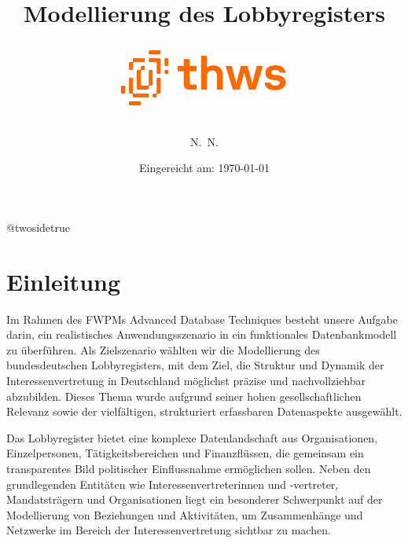 \documentclass[12pt,twoside=false,a4paper,parskip]{scrbook}
\makeatletter
\def\BaAuthor{Noah Raupold (5022097),\\ David Gläsle(5022114)}
\def\BaAuthorStudyProgram{Informatik} %
\def\BaType{ADT Portfolio} %
\def\BaTitle{Modellierung des Lobbyregisters}
\def\BaDeadline{\today}
\def\ShowBaAuthor{\BaAuthor}
\def\ShowBaAuthor{N.~N.}
\newcommand*{\forcetwosidetitle}{
\begingroup
\cleardoubleoddpage
\KOMAoptions{titlepage=true}%
\csname @twosidetrue\endcsname
\maketitle
\endgroup
}
\makeatother
\begin{document}
\frontmatter
\titlehead{
{Technische Hochschule Würzburg-Schweinfurt\\
Fakultät Informatik und Wirtschaftsinformatik}}
\subject{\BaType}
\title{\BaTitle\\[15mm]
\begin{figure}[H]
\centering
\includegraphics[width=0.5\textwidth]{Logo.png}
\label{fig:logo}
\end{figure}}
\author{\ShowBaAuthor}
\date{\normalsize{Eingereicht am: \BaDeadline}}
\forcetwosidetitle


\newpage
\setcounter{secnumdepth}{4}
\setcounter{tocdepth}{4}
\tableofcontents



\mainmatter
\mainmatter

\chapter{Einleitung}
Im Rahmen des FWPMs Advanced Database Techniques besteht unsere Aufgabe darin, ein realistisches Anwendungsszenario in ein funktionales Datenbankmodell zu überführen. Als Zielszenario wählten wir die Modellierung des bundesdeutschen Lobbyregisters, mit dem Ziel, die Struktur und Dynamik der Interessenvertretung in Deutschland möglichst präzise und nachvollziehbar abzubilden. Dieses Thema wurde aufgrund seiner hohen gesellschaftlichen Relevanz sowie der vielfältigen, strukturiert erfassbaren Datenaspekte ausgewählt.

Das Lobbyregister bietet eine komplexe Datenlandschaft aus Organisationen, Einzelpersonen, Tätigkeitsbereichen und Finanzflüssen, die gemeinsam ein transparentes Bild politischer Einflussnahme ermöglichen sollen. Neben den grundlegenden Entitäten wie Interessenvertreterinnen und -vertreter, Mandatsträgern und Organisationen liegt ein besonderer Schwerpunkt auf der Modellierung von Beziehungen und Aktivitäten, um Zusammenhänge und Netzwerke im Bereich der Interessenvertretung sichtbar zu machen.
\end{document}
